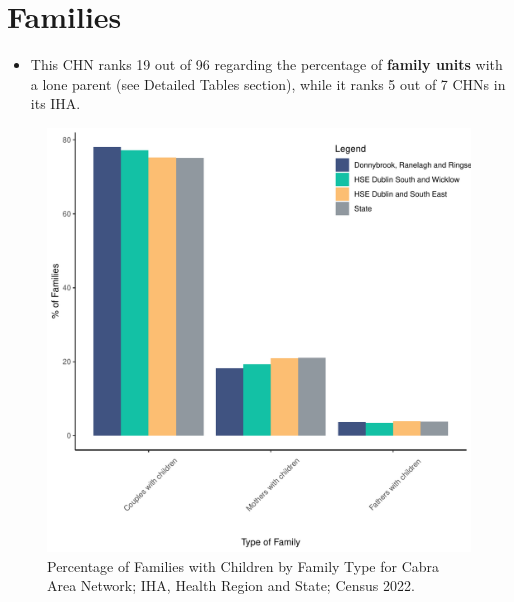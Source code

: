 \documentclass{article}
\begin{document}
\section{Families}\label{sect:Fam}
\begin{itemize}
\item This CHN ranks  19 out of 96 regarding the percentage of \textbf{family units} with a lone parent (see Detailed Tables section), while it ranks   5 out of 7 CHNs in its IHA.
\end{itemize}
\begin{figure}[H]
	\centering
	\includegraphics[width = 150mm]{../figures/FamED.pdf}
	\caption{Percentage of Families with Children by Family Type for Cabra Area Network; IHA, Health Region and State; Census 2022.}
	\label{fig:vbnv}
	\end{figure}
	
\end{document}
